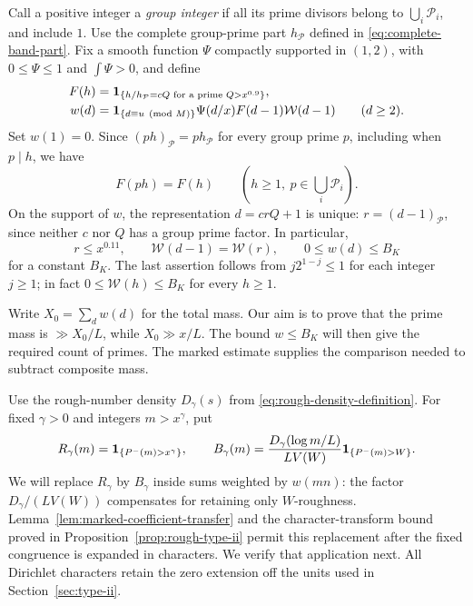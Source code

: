 Call a positive integer a \emph{group integer} if all its prime
divisors belong to \(\bigcup_i\mathcal P_i\), and include \(1\).
Use the complete group-prime part $h_{\mathcal P}$ defined in
\eqref{eq:complete-band-part}. Fix a smooth function $\Psi$
compactly supported in \((1,2)\), with \(0\le\Psi\le1\) and
\(\int\Psi>0\), and define
\begin{equation}\label{con:weight}
 \begin{split}
 F(h)&=\mathbf{1}_{\{h/h_{\mathcal P}=cQ\text{ for a prime }Q>x^{0.9}\}},\\
 w(d)&=\mathbf{1}_{\{d\equiv u\pmod M\}}\Psi(d/x)
                                  F(d-1)\mathcal W(d-1)\qquad(d\ge2).
 \end{split}
\end{equation}
Set \(w(1)=0\).  Since \((ph)_{\mathcal P}=p h_{\mathcal P}\) for
every group prime \(p\), including when \(p\mid h\), we have
\begin{equation}\label{con:invariance}
 F(ph)=F(h)\qquad(h\ge1,\ p\in\textstyle\bigcup_i\mathcal P_i).
\end{equation}
On the support of \(w\), the representation \(d=crQ+1\) is unique:
\(r=(d-1)_{\mathcal P}\), since neither \(c\) nor \(Q\) has a
group prime factor.  In particular,
\begin{equation}\label{con:support}
 r\le x^{0.11},\qquad \mathcal W(d-1)=\mathcal W(r),\qquad
 0\le w(d)\le B_K
\end{equation}
for a constant \(B_K\).  The last assertion follows from
\(j2^{1-j}\le1\) for each integer \(j\ge1\); in fact
\(0\le\mathcal W(h)\le B_K\) for every \(h\ge1\).

Write \(X_0=\sum_d w(d)\) for the total mass.  Our aim is to prove
that the prime mass is \(\gg X_0/L\), while \(X_0\gg x/L\).
The bound \(w\le B_K\) will then give the required count of primes.
The marked estimate supplies the comparison needed to subtract
composite mass.

Use the rough-number density $D_\gamma(s)$ from
\eqref{eq:rough-density-definition}.  For fixed \(\gamma>0\) and integers
\(m>x^\gamma\), put
\begin{equation}\label{con:proxies}
 R_\gamma(m)=\mathbf{1}_{\{P^-(m)>x^\gamma\}},\qquad
 B_\gamma(m)=\frac{D_\gamma(\log m/L)}{LV(W)}
                         \mathbf{1}_{\{P^-(m)>W\}}.
\end{equation}
We will replace \(R_\gamma\) by \(B_\gamma\) inside sums weighted
by \(w(mn)\): the factor \(D_\gamma/(LV(W))\) compensates for
retaining only \(W\)-roughness. Lemma~\ref{lem:marked-coefficient-transfer}
and the character-transform bound proved in
Proposition~\ref{prop:rough-type-ii} permit this replacement after
the fixed congruence is expanded in characters. We verify that
application next. All Dirichlet characters retain the zero extension
off the units used in Section~\ref{sec:type-ii}.


